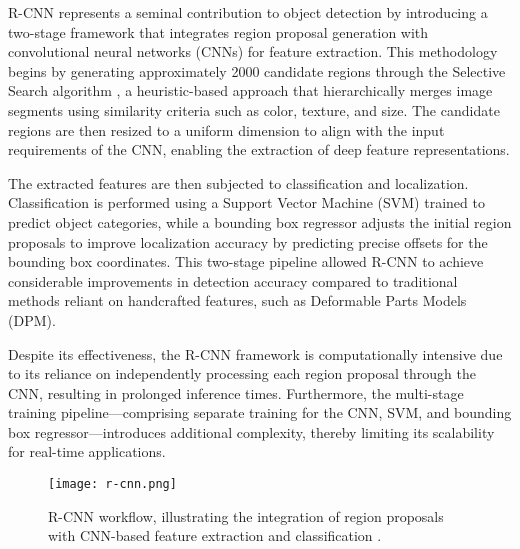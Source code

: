 \documentclass[3p,times]{elsarticle}
\begin{document}
R-CNN \citet{girshick2014richfeaturehierarchiesaccurate} represents a seminal contribution to object detection by introducing a two-stage framework that integrates region proposal generation with convolutional neural networks (CNNs) for feature extraction. This methodology begins by generating approximately 2000 candidate regions through the Selective Search algorithm \citet{Uijlings2013SelectiveSF}, a heuristic-based approach that hierarchically merges image segments using similarity criteria such as color, texture, and size. The candidate regions are then resized to a uniform dimension to align with the input requirements of the CNN, enabling the extraction of deep feature representations.

The extracted features are then subjected to classification and localization. Classification is performed using a Support Vector Machine (SVM) trained to predict object categories, while a bounding box regressor adjusts the initial region proposals to improve localization accuracy by predicting precise offsets for the bounding box coordinates. This two-stage pipeline allowed R-CNN to achieve considerable improvements in detection accuracy compared to traditional methods reliant on handcrafted features, such as Deformable Parts Models (DPM).

Despite its effectiveness, the R-CNN framework is computationally intensive due to its reliance on independently processing each region proposal through the CNN, resulting in prolonged inference times. Furthermore, the multi-stage training pipeline—comprising separate training for the CNN, SVM, and bounding box regressor—introduces additional complexity, thereby limiting its scalability for real-time applications.

\begin{figure}[H] \centering \texttt{[image: r-cnn.png]} \caption{R-CNN workflow, illustrating the integration of region proposals with CNN-based feature extraction and classification \citet{girshick2014richfeaturehierarchiesaccurate}.} \label{fig} \end{figure}
\end{document}
